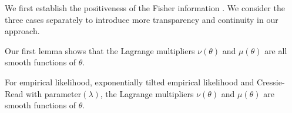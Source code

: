 We first establish the positiveness of the Fisher information . We
consider the three cases separately to introduce more transparency
and continuity in our approach. 

Our first lemma shows that the Lagrange multipliers $\nu\left(\theta\right)$
and $\mu\left(\theta\right)$ are all smooth functions of $\theta$.
\begin{comment}
add condtions
\end{comment}

\begin{lem}
\label{lem:first-order-smooth-lagmul}For empirical likelihood, exponentially
tilted empirical likelihood and Cressie-Read with parameter$\left(\lambda\right)$,
the Lagrange multipliers $\nu\left(\theta\right)$ and $\mu\left(\theta\right)$
are smooth functions of $\theta.$\end{lem}
